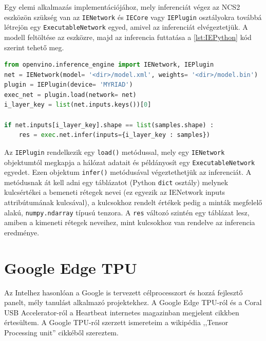 Egy elemi alkalmazás implementációjához, mely inferenciát végez az NCS2 eszközön szükség van az \verb|IENetwork| és \verb|IECore| vagy \verb|IEPlugin| osztályokra továbbá létrejön egy \verb|ExecutableNetwork| egyed, amivel az inferenciát elvégeztetjük. A modell feltöltése az eszközre, majd az inferencia futtatása a \ref{lst:IEPython} kód szerint tehető meg.
\begin{minipage}{\textwidth}
	\begin{lstlisting}[language=Python,caption=Inference Engine használata PYthon-ból ]
from openvino.inference_engine import IENetwork, IEPlugin
net = IENetwork(model= '<dir>/model.xml', weights= '<dir>/model.bin')
plugin = IEPlugin(device= 'MYRIAD')
exec_net = plugin.load(network= net)
i_layer_key = list(net.inputs.keys())[0]

if net.inputs[i_layer_key].shape == list(samples.shape) :
	res = exec.net.infer(inputs={i_layer_key : samples})
	\end{lstlisting}\label{lst:IEPython}
\end{minipage}
Az \verb|IEPlugin| rendelkezik egy \verb|load()| metódussal, mely egy \verb|IENetwork| objektumtól megkapja a hálózat adatait és példányosít egy \verb|ExecutableNetwork| egyedet. Ezen objektum \verb|infer()| metódusával végeztethetjük az inferenciát. A metódusnak át kell adni egy táblázatot (Python \verb|dict| osztály) melynek kulcsértékei a bemeneti rétegek nevei (ez egyezik az IENetwork inputs attribútumának kulcsával), a kulcsokhoz rendelt értékek pedig a minták megfelelő alakú, \verb|numpy.ndarray| típusú tenzora. A \verb|res| változó szintén egy táblázat lesz, amiben a kimeneti rétegek neveihez, mint kulcsokhoz van rendelve az inferencia eredménye.

\section{Google Edge TPU}
Az Intelhez hasonlóan a Google is tervezett célprocesszort és hozzá fejlesztő panelt, mély tanulást alkalmazó projektekhez. A Google Edge TPU-ról és a Coral USB Accelerator-ról a Heartbeat internetes magazinban megjelent cikkben értesültem.\cite{web:GoogleEdge} A Google TPU-ról szerzett ismereteim a wikipédia ,,Tensor Processing unit'' cikkéből szereztem.\cite{wiki:TPU}

